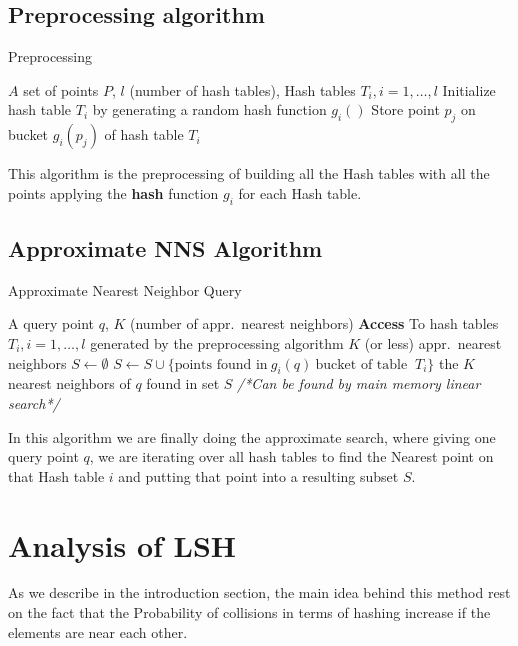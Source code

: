 \documentclass[12pt, a4paper]{article}
\theoremstyle{definition}
\begin{document}
\subsection{Preprocessing algorithm}

    \begin{algorithm}
     \label{alg:preproc}
     \caption{Preprocessing}
     \begin{algorithmic}
     \REQUIRE $A$ set of points $P$,
     \STATE $l$ (number of hash tables),
     \ENSURE Hash tables $T_i, i = 1, \dots ,l$
      \STATE Initialize hash table $T_i$ by generating
      a random hash function $g_i()$
     \ENDFOR
         \STATE Store point $p_j$ on bucket $g_i(p_j)$ of hash table $T_i$
       \ENDFOR
     \ENDFOR
   \end{algorithmic}
   \end{algorithm}

   This algorithm is the preprocessing of building all the Hash tables with all the points applying the \textbf{hash} function $g_i$ for each Hash table.

\subsection{Approximate NNS Algorithm}

\begin{algorithm}
  \label{algo:nns}
  \caption{Approximate Nearest Neighbor Query}
  \begin{algorithmic}
  \REQUIRE A query point $q$,
  \STATE $K$ (number of appr.\ nearest neighbors)
  \STATE \textbf{Access} To hash tables $T_i, i = 1, \dots, l$ generated by the preprocessing algorithm
  \ENSURE $K$ (or less) appr.\ nearest neighbors
  \STATE $S \leftarrow \emptyset$
    \STATE $S \leftarrow S \cup \{ \text{points found in}\ g_i(q)\ \text{bucket of table }\ T_i\}$
  \ENDFOR
  \RETURN the $K$ nearest neighbors of $q$ found in set $S$
  \STATE \textit{/*Can be found by main memory linear search*/}
  \end{algorithmic}
\end{algorithm}

In this algorithm we are finally doing the approximate search, where giving one query point $q$, we are iterating over all hash tables to find the Nearest point on that Hash table $i$ and putting that point into a resulting subset $S$.

\section{Analysis of LSH}
As we describe in the introduction section, the main idea behind this method rest on the fact that the Probability of collisions in terms of hashing increase if the elements are near each other.
\end{document}
